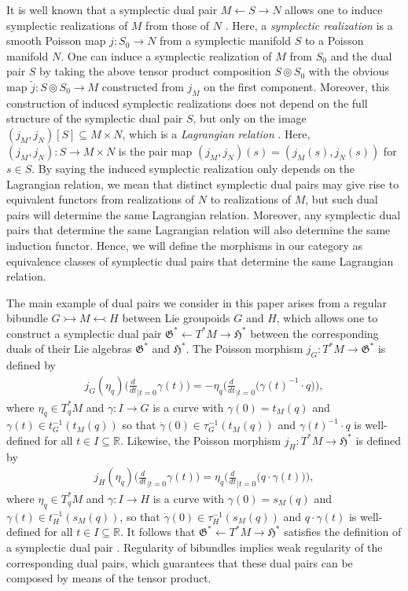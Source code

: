 \documentclass[sn-mathphys,Numbered]{sn-jnl}
\begin{document}
It is well known that a symplectic dual pair $M\leftarrow S\rightarrow N$ allows one to induce symplectic realizations of $M$ from those of $N$ \citep{La95b}.  Here, a \emph{symplectic realization} is a smooth Poisson map $j: S_0\to N$ from a symplectic manifold $S$ to a Poisson manifold $N$.  One can induce a symplectic realization of $M$ from $S_0$ and the dual pair $S$ by taking the above tensor product composition $S\circledcirc S_0$ with the obvious map $\tilde{j}: S\circledcirc S_0\to M$ constructed from $j_M$ on the first component.  Moreover, this construction of induced symplectic realizations does not depend on the full structure of the symplectic dual pair $S$, but only on the image $(j_M,j_N)[S]\subseteq M\times N$, which is a \emph{Lagrangian relation} \citep{We10}.  Here, $(j_M,j_N): S\to M\times N$ is the pair map $(j_M,j_N)(s) = (j_M(s),j_N(s))$ for $s\in S$.  By saying the induced symplectic realization only depends on the Lagrangian relation, we mean that distinct symplectic dual pairs may give rise to equivalent functors from realizations of $N$ to realizations of $M$, but such dual pairs will determine the same Lagrangian relation.  Moreover, any symplectic dual pairs that determine the same Lagrangian relation will also determine the same induction functor.  Hence, we will define the morphisms in our category as equivalence classes of symplectic dual pairs that determine the same Lagrangian relation.

The main example of dual pairs we consider in this paper arises from a regular bibundle $G\rightarrowtail M\leftarrowtail H$ between Lie groupoids $G$ and $H$, which allows one to construct a symplectic dual pair $\mathfrak{G}^*\leftarrow T^*M\rightarrow \mathfrak{H}^*$ between the corresponding duals of their Lie algebras $\mathfrak{G}^*$ and $\mathfrak{H}^*$.  The Poisson morphism $j_G: T^*M\to \mathfrak{G}^*$ is defined by
\begin{align}
\label{eq:left_momentum_map}
    j_G(\eta_q)\Big(\frac{d}{dt}_{|t=0} \gamma(t)\Big) = -\eta_q\Big(\frac{d}{dt}_{|t=0}\big(\gamma(t)^{-1}\cdot q\big)\Big),
\end{align}
where $\eta_q\in T^*_qM$ and $\gamma:I\to G$ is a curve with $\gamma(0) = t_M(q)$ and $\gamma(t)\in t_G^{-1}(t_M(q))$ so that $\dot{\gamma}(0)\in \tau_G^{-1}(t_M(q))$ and $\gamma(t)^{-1}\cdot q$ is well-defined for all $t\in I\subseteq \mathbb{R}$.  Likewise, the Poisson morphism $j_H: T^*M\to \mathfrak{H}^*$ is defined by
\begin{align}
\label{eq:right_momentum_map}
    j_H(\eta_q)\Big(\frac{d}{dt}_{|t=0} \gamma(t)\Big) = \eta_q\Big(\frac{d}{dt}_{|t=0} \big(q\cdot \gamma(t)\big)\Big),
\end{align}
where $\eta_q\in T^*_qM$ and $\gamma: I\to H$ is a curve with $\gamma(0) = s_M(q)$ and $\gamma(t)\in t_H^{-1}(s_M(q))$, so that $\dot{\gamma}(0)\in \tau_H^{-1}(s_M(q))$ and $q\cdot \gamma(t)$ is well-defined for all $t\in I\subseteq \mathbb{R}$.  It follows that $\mathfrak{G}^*\leftarrow T^*M\rightarrow \mathfrak{H}^*$ satisfies the definition of a symplectic dual pair \citep{La00,La01a}.  Regularity of bibundles implies weak regularity of the corresponding dual pairs, which guarantees that these dual pairs can be composed by means of the tensor product.
\end{document}
